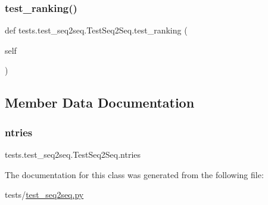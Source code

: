 \subsubsection{\texorpdfstring{test\+\_\+ranking()}{test\_ranking()}}
{\footnotesize\ttfamily def tests.\+test\+\_\+seq2seq.\+Test\+Seq2\+Seq.\+test\+\_\+ranking (\begin{DoxyParamCaption}\item[{}]{self }\end{DoxyParamCaption})}



\subsection{Member Data Documentation}
\mbox{\label{classtests_1_1test__seq2seq_1_1TestSeq2Seq_a5681e61335c043954e727fa9eb4b1eb3}} 
\subsubsection{\texorpdfstring{ntries}{ntries}}
{\footnotesize\ttfamily tests.\+test\+\_\+seq2seq.\+Test\+Seq2\+Seq.\+ntries\hspace{0.3cm}{\ttfamily [static]}}



The documentation for this class was generated from the following file\+:\begin{DoxyCompactItemize}
\item 
tests/\hyperlink{test__seq2seq_8py}{test\+\_\+seq2seq.\+py}\end{DoxyCompactItemize}
